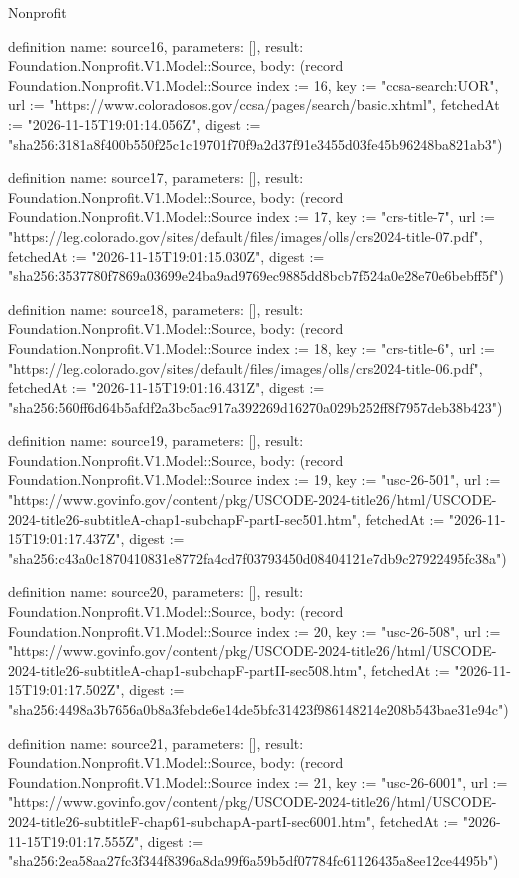 \begin{lexlean}{Nonprofit}
\begin{semanticmodule}
definition{
  name: source16,
  parameters: [],
  result: Foundation.Nonprofit.V1.Model::Source,
  body: (record Foundation.Nonprofit.V1.Model::Source {index := 16, key := "ccsa-search:UOR", url := "https://www.coloradosos.gov/ccsa/pages/search/basic.xhtml", fetchedAt := "2026-11-15T19:01:14.056Z", digest := "sha256:3181a8f400b550f25c1c19701f70f9a2d37f91e3455d03fe45b96248ba821ab3"})
}

definition{
  name: source17,
  parameters: [],
  result: Foundation.Nonprofit.V1.Model::Source,
  body: (record Foundation.Nonprofit.V1.Model::Source {index := 17, key := "crs-title-7", url := "https://leg.colorado.gov/sites/default/files/images/olls/crs2024-title-07.pdf", fetchedAt := "2026-11-15T19:01:15.030Z", digest := "sha256:3537780f7869a03699e24ba9ad9769ec9885dd8bcb7f524a0e28e70e6bebff5f"})
}

definition{
  name: source18,
  parameters: [],
  result: Foundation.Nonprofit.V1.Model::Source,
  body: (record Foundation.Nonprofit.V1.Model::Source {index := 18, key := "crs-title-6", url := "https://leg.colorado.gov/sites/default/files/images/olls/crs2024-title-06.pdf", fetchedAt := "2026-11-15T19:01:16.431Z", digest := "sha256:560ff6d64b5afdf2a3bc5ac917a392269d16270a029b252ff8f7957deb38b423"})
}

definition{
  name: source19,
  parameters: [],
  result: Foundation.Nonprofit.V1.Model::Source,
  body: (record Foundation.Nonprofit.V1.Model::Source {index := 19, key := "usc-26-501", url := "https://www.govinfo.gov/content/pkg/USCODE-2024-title26/html/USCODE-2024-title26-subtitleA-chap1-subchapF-partI-sec501.htm", fetchedAt := "2026-11-15T19:01:17.437Z", digest := "sha256:c43a0c1870410831e8772fa4cd7f03793450d08404121e7db9c27922495fc38a"})
}

definition{
  name: source20,
  parameters: [],
  result: Foundation.Nonprofit.V1.Model::Source,
  body: (record Foundation.Nonprofit.V1.Model::Source {index := 20, key := "usc-26-508", url := "https://www.govinfo.gov/content/pkg/USCODE-2024-title26/html/USCODE-2024-title26-subtitleA-chap1-subchapF-partII-sec508.htm", fetchedAt := "2026-11-15T19:01:17.502Z", digest := "sha256:4498a3b7656a0b8a3febde6e14de5bfc31423f986148214e208b543bae31e94c"})
}

definition{
  name: source21,
  parameters: [],
  result: Foundation.Nonprofit.V1.Model::Source,
  body: (record Foundation.Nonprofit.V1.Model::Source {index := 21, key := "usc-26-6001", url := "https://www.govinfo.gov/content/pkg/USCODE-2024-title26/html/USCODE-2024-title26-subtitleF-chap61-subchapA-partI-sec6001.htm", fetchedAt := "2026-11-15T19:01:17.555Z", digest := "sha256:2ea58aa27fc3f344f8396a8da99f6a59b5df07784fc61126435a8ee12ce4495b"})
}


\end{semanticmodule}
\end{lexlean}
